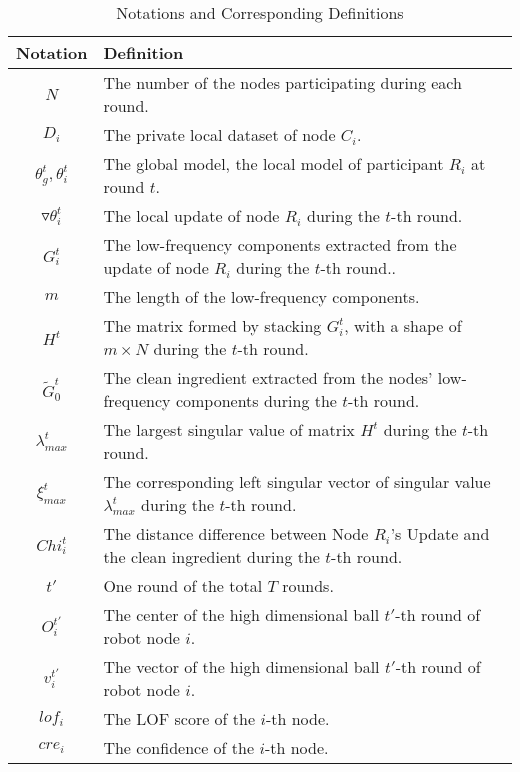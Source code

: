 \documentclass[lettersize,journal]{IEEEtran}
\begin{document}
\begin{table*}[h]
\centering
\caption{Notations and Corresponding Definitions}
\label{tabl:notations}
\begin{tabular}{|c|l|}
\hline
\textbf{Notation} & \textbf{Definition} \\ \hline
$ N $ & The number of the nodes participating during each round. \\ \hline
$D_i$ & The private local dataset of node $C_i$. \\ \hline

$\theta_g^t, \theta_i^t$ & The global model, the local model of participant $R_i$ at round $t$. \\ \hline
$\triangledown \theta_i^t$ & The local update of node $R_i$ during the $t$-th round. \\ \hline
$G_i^t $ & The low-frequency components extracted from the update of node $R_i$ during the $t$-th round.. \\ \hline
$m$ & The length of the low-frequency components. \\ \hline
$H^t$ & The matrix formed by stacking $G_i^t$, with a shape of $m \times N$ during the $t$-th round. \\ \hline
$\tilde{G}_{0}^t $ & The clean ingredient extracted from the nodes' low-frequency components during the $t$-th round. \\ \hline
$\lambda_{max}^t$ & The largest singular value of matrix $H^t$ during the $t$-th round. \\ \hline
$\xi_{max}^t$ & The corresponding left singular vector of singular value $\lambda_{max}^t$ during the $t$-th round. \\ \hline
$Chi_i^t$ & The distance difference between Node $R_i$'s Update and the clean ingredient during the $t$-th round. \\ \hline
$t'$ & One round of the total $T$ rounds. \\ \hline
$O_i^{t'}$ &  The center of the high dimensional ball $t'$-th round of robot node $i$. \\ \hline
\( {v}_{i}^{t'} \) & The vector of the high dimensional ball $t'$-th round of robot node $i$.\\ \hline
$lof_i$ & The LOF score of the $i$-th node.\\ \hline
$cre_i$ & The confidence of the $i$-th node.\\ \hline


\end{tabular}
\end{table*}
\end{document}
